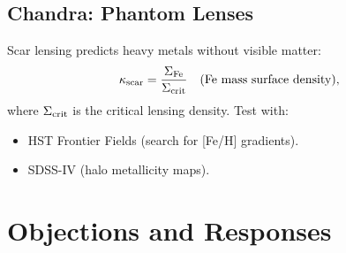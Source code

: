\documentclass{article}
\begin{document}
\subsection{Chandra: Phantom Lenses}
Scar lensing predicts heavy metals without visible matter:
\begin{equation}
    \kappa_{\rm scar} = \frac{\Sigma_{\rm Fe}}{\Sigma_{\rm crit}} \quad \text{(Fe mass surface density)},
\end{equation}
where $\Sigma_{\rm crit}$ is the critical lensing density. Test with:
\begin{itemize}
    \item HST Frontier Fields (search for [Fe/H] gradients).
    \item SDSS-IV (halo metallicity maps).
\end{itemize}


\section{Objections and Responses}  
\label{sec:objections}  
\end{document}
